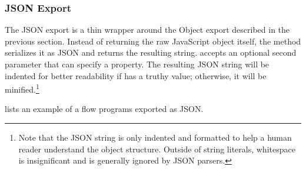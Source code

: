 \subsubsection{JSON Export}
\label{sec:json-export}

The JSON export is a thin wrapper around the Object export described in the previous section. Instead of returning the raw JavaScript object itself, the  method serializes it as JSON and returns the resulting string.  accepts an optional second parameter that can specify a  property. The resulting JSON string will be indented for better readability if  has a truthy value; otherwise, it will be minified.\footnote{Note that the JSON string is only indented and formatted to help a human reader understand the object structure. Outside of string literals, whitespace is insignificant and is generally ignored by JSON parsers.}

 lists an example of a flow programs exported as JSON.